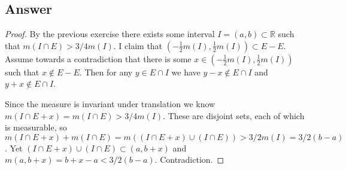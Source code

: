 \documentclass[12pt]{article}
\begin{document}
\subsection{Answer}
\begin{proof}
By the previous exercise there exists some interval $I =(a,b)\subset \mathbb{R}$ such that $m(I \cap E) > 3/4 m(I)$. I claim that $(-\frac{1}{2}m(I),\frac{1}{2}m(I)) \subset E-E$. Assume towards a contradiction that there is some $x \in (-\frac{1}{2}m(I),\frac{1}{2}m(I))$ such that $x \notin E-E$. Then for any $y \in E\cap I$ we have $y-x \notin E\cap I$ and $y+x \notin E\cap I$. 

Since the measure is invariant under translation we know $m(I\cap E+x)=m(I\cap E)>3/4m(I)$. These are disjoint sets, each of which is measurable, so $m(I\cap E+x)+m(I\cap E)=m((I\cap E+x) \cup (I\cap E))>3/2m(I)=3/2(b-a)$. Yet $(I\cap E+x) \cup (I\cap E)\subset (a,b+x)$ and $m(a,b+x)=b+x-a<3/2(b-a)$. Contradiction.
\end{proof}
\end{document}
